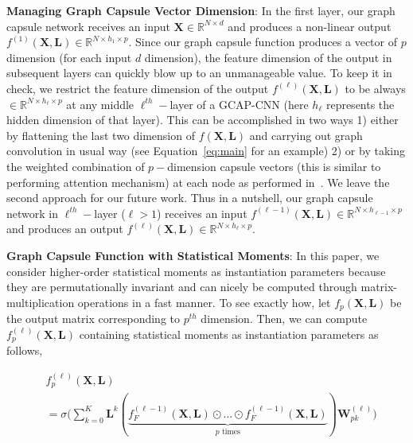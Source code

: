 \documentclass{article}
\begin{document}
\noindent \textbf{Managing Graph Capsule Vector Dimension}: In the first layer, our graph capsule network receives an input $\mathbf{X} \in \mathbb{R}^{N \times d} $ and produces a non-linear output $f^{(1)}(\mathbf{X}, \mathbf{L}) \in \mathbb{R}^{N \times h_1 \times p} $. Since our graph capsule function produces a vector of $p$ dimension (for each input $d$ dimension), the feature  dimension of the output in subsequent layers can quickly blow up to an unmanageable value. To keep it in check, we restrict the feature  dimension of the output $f^{(\ell)}(\mathbf{X}, \mathbf{L})$ to be always $ \in \mathbb{R}^{N \times h_{\ell}\times p} $  at any middle $\ell^{th}-$layer of a GCAP-CNN (here $h_\ell$ represents the hidden dimension of that layer). This can be accomplished in two ways  1) either by flattening the last two dimension of $f(\mathbf{X}, \mathbf{L})$   and carrying out graph convolution in usual way (see Equation~\ref{eq:main} for an example)  2) or  by taking the weighted combination of $p-$dimension capsule vectors  (this is similar to performing attention mechanism) at each node as performed in~\cite{sabour2017dynamic}. We leave the second approach for our future work.  Thus in a nutshell,   our graph capsule network in  $\ell^{th}-$layer ($\ell>1$) receives an input $f^{(\ell-1)}(\mathbf{X}, \mathbf{L}) \in \mathbb{R}^{N \times h_{\ell-1}\times p} $ and produces an output  $f^{(\ell)}(\mathbf{X}, \mathbf{L}) \in \mathbb{R}^{N \times h_{\ell} \times p} $.



\noindent \textbf{Graph Capsule Function with Statistical Moments}: In this paper,  we consider higher-order statistical moments as instantiation parameters because they are permutationally invariant and can nicely be computed through   matrix-multiplication operations in a fast manner. To see exactly how, let $f_p(\mathbf{X}, \mathbf{L})$ be the output  matrix corresponding to $p^{th}$ dimension. Then, we can  compute  $f_p^{(\ell)}(\mathbf{X}, \mathbf{L})$ containing statistical moments as instantiation parameters as follows, 

\begin{equation}\label{eq:main}
\begin{split}
& f_p^{(\ell)}(\mathbf{X}, \mathbf{L})  \\
& = \sigma\Big(\sum_{k=0}^{K} \mathbf{L}^{k}(\underbrace{f^{(\ell-1)}_{F}(\mathbf{X}, \mathbf{L}) \odot ...\odot f^{(\ell-1)}_{F}(\mathbf{X}, \mathbf{L})}_{p \text{ times}})\mathbf{W}_{pk}^{(\ell)} \Big) \\
\end{split}
\end{equation}
\end{document}
